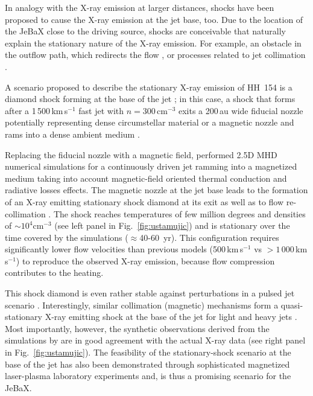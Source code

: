 \documentclass[graybox, nosecnum]{svmult}
\begin{document}
In analogy with the X-ray emission at larger distances, shocks have been proposed to cause the X-ray emission at the jet base, too. Due to the location of the JeBaX close to the driving source, shocks  are conceivable that  naturally explain the stationary nature of the X-ray emission. For example, an obstacle in the outflow path, which redirects the flow \citep[either the magnetic field or the dense ambient medium, see][]{Bally_2003,Guenther_2014}, or processes related to jet collimation \citep[e.g.][]{Schneider_2011}. 

A scenario proposed to describe the stationary X-ray emission of HH~154 is a diamond shock forming at the base of the jet \cite{Bonito_2011}; in this case, a shock that forms after a 1\,500\,km\,s$^{-1}$ fast jet with $n=300\,$cm$^{-3}$ exits a 200\,au wide fiducial nozzle potentially representing dense circumstellar material or a magnetic nozzle and rams into a dense ambient medium \citep[$n=3\times10^3\,$cm$^{-3}$,][]{Bonito_2011}.


Replacing the fiducial nozzle with a magnetic field, \citet{Ustamujic_2016} performed  2.5D MHD numerical simulations for a continuously driven jet ramming into a magnetized medium taking into account magnetic-field oriented thermal conduction  and radiative losses effects. The magnetic nozzle at the jet base leads to the formation of an X-ray emitting stationary shock diamond at its exit as well as to flow re-collimation \citep[see 3D reconstruction in left panel in Fig.~\ref{fig:ustamujic} and][]{Ustamujic_2016}. The shock reaches temperatures of few million degrees and densities of $\sim 10^4$cm$^{-3}$ (see left panel in Fig.~\ref{fig:ustamujic}) and is stationary over the time covered by the simulations ($\approx$40-60~yr). This configuration requires significantly lower flow velocities than previous models (500\,km\,s$^{-1}$ vs $>1\,000\,$km\,s$^{-1}$)
to reproduce the observed X-ray emission, because flow compression contributes to the heating.

This shock diamond is even rather stable against perturbations in a pulsed jet scenario \cite{Ustamujic_2018}. Interestingly, similar collimation (magnetic) mechanisms form a quasi-stationary X-ray emitting shock at the base of the jet for light and heavy jets \cite{Ustamujic_2018}. Most importantly, however, the synthetic observations derived from the simulations by \citet{Ustamujic_2018} are in good agreement with the actual X-ray data (see right panel in Fig.~\ref{fig:ustamujic}). The feasibility of the stationary-shock scenario at the base of the jet has also been demonstrated through sophisticated magnetized laser-plasma laboratory experiments \cite{Albertazzi_2014, PhysRevLett.119.255002} and, is thus a promising scenario for the JeBaX.
\end{document}

